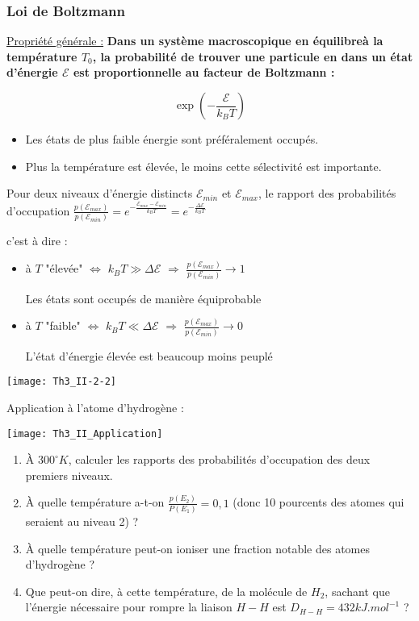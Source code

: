 \documentclass[a4paper,12pt]{book}
\begin{document}
\subsubsection{Loi de Boltzmann}
\underline{Propriété générale :} \textbf{Dans un système macroscopique en équilibreà la température $T_0$, la probabilité de trouver une particule en dans un état d'énergie $\mathcal{E}$ est proportionnelle au facteur de Boltzmann :}
\par $$\exp\left(-\frac{\mathcal{E}}{k_BT}\right)$$\begin{itemize}
\item Les états de plus faible énergie sont préféralement occupés.
\item Plus la température est élevée, le moins cette sélectivité est importante.
\end{itemize}
Pour deux niveaux d'énergie distincts $\mathcal{E}_{min}$ et $\mathcal{E}_{max}$, le rapport des probabilités d'occupation $\frac{p(\mathcal{E}_{max})}{p(\mathcal{E}_{min})}=e^{-\frac{\mathcal{E}_{max}-\mathcal{E}_{min}}{k_BT}}= e^{-\frac{\Delta\mathcal{E}}{k_BT}}$ 
\par c'est à dire :\begin{itemize}
\item à $T$ "élevée" $\Leftrightarrow$ $k_BT\gg \Delta\mathcal{E}$ $\Rightarrow$ $\frac{p(\mathcal{E}_{max})}{p(\mathcal{E}_{min})}\to 1$
\par Les états sont occupés de manière équiprobable
\item à $T$ "faible" $\Leftrightarrow$ $k_BT\ll \Delta\mathcal{E}$ $\Rightarrow$ $\frac{p(\mathcal{E}_{max})}{p(\mathcal{E}_{min})}\to 0$
\par L'état d'énergie élevée est beaucoup moins peuplé
\end{itemize}
\texttt{[image: Th3\_II-2-2]}
\par Application à l'atome d'hydrogène :
\par \texttt{[image: Th3\_II\_Application]}
\par
\par \begin{enumerate}
\item À $300^\circ K$, calculer les rapports des probabilités d'occupation des deux premiers niveaux.
\item À quelle température a-t-on $\frac{p(E_2)}{P(E_1)}=0,1$ (donc 10 pourcents des atomes qui seraient au niveau 2) ?
\item À quelle température peut-on ioniser une fraction notable des atomes d'hydrogène ?
\item Que peut-on dire, à cette température, de la molécule de $H_2$, sachant que l'énergie nécessaire pour rompre la liaison $H-H$ est $D_{H-H}=432kJ.mol^{-1}$ ?
\end{enumerate}
\end{document}
